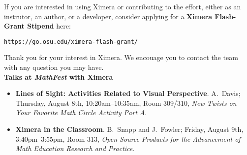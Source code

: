 \documentclass{article}
\begin{document}
\begin{multicols}{2}
    If you are interested in using Ximera or contributing to the effort, either as an instrutor, an author, or a developer, consider
    applying for a \textbf{Ximera Flash-Grant Stipend} here:
    \begin{center}
      \tt  https://go.osu.edu/ximera-flash-grant/
    \end{center}
    Thank you for your interest in Ximera. We encouage you
    to contact the team with  any question you may have.
    \\[.5cm]
    {\sffamily\bfseries Talks at \textsl{MathFest} with Ximera}\\
    \begin{itemize}
        \item[{[1]}] \textbf{Lines of Sight: Activities Related to Visual
            Perspective}. A.\ Davis; Thursday, August 8th, 10:20am--10:35am, Room 309/310,
        \textit{New Twists on Your Favorite Math Circle Activity Part A}.
        \item[{[2]}] \textbf{Ximera in the Classroom}. B.\ Snapp and J.\ Fowler;
        Friday, August 9th, 3:40pm--3:55pm, Room 313, \textit{Open-Source Products for
            the Advancement of Math Education Research and Practice}.
    \end{itemize}

\end{multicols}
\end{document}
